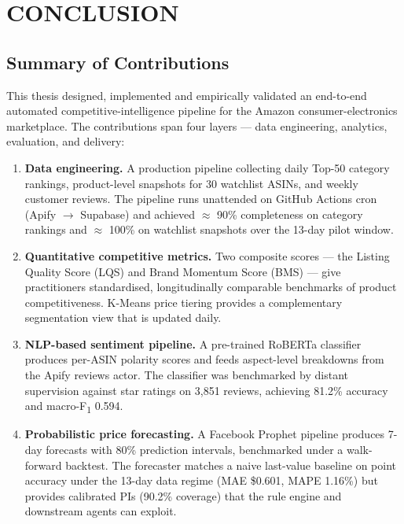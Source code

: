 \chapter{CONCLUSION}

\section{Summary of Contributions}

This thesis designed, implemented and empirically validated an end-to-end
automated competitive-intelligence pipeline for the Amazon
consumer-electronics marketplace. The contributions span four layers ---
data engineering, analytics, evaluation, and delivery:

\begin{enumerate}
  \item \textbf{Data engineering.} A production pipeline collecting daily
  Top-50 category rankings, product-level snapshots for 30 watchlist
  ASINs, and weekly customer reviews. The pipeline runs unattended on
  GitHub Actions cron (Apify $\to$ Supabase) and achieved
  $\approx$ 90\% completeness on category rankings and $\approx$ 100\%
  on watchlist snapshots over the 13-day pilot window.

  \item \textbf{Quantitative competitive metrics.} Two composite scores
  --- the Listing Quality Score (LQS) and Brand Momentum Score (BMS) ---
  give practitioners standardised, longitudinally comparable benchmarks of
  product competitiveness. K-Means price tiering provides a complementary
  segmentation view that is updated daily.

  \item \textbf{NLP-based sentiment pipeline.} A pre-trained RoBERTa
  classifier produces per-ASIN polarity scores and feeds aspect-level
  breakdowns from the Apify reviews actor. The classifier was benchmarked
  by distant supervision against star ratings on 3{,}851 reviews,
  achieving 81.2\% accuracy and macro-F\textsubscript{1} 0.594.

  \item \textbf{Probabilistic price forecasting.} A Facebook Prophet
  pipeline produces 7-day forecasts with 80\% prediction intervals,
  benchmarked under a walk-forward backtest. The forecaster matches a naive
  last-value baseline on point accuracy under the 13-day data regime
  (MAE \$0.601, MAPE 1.16\%) but provides calibrated PIs (90.2\% coverage)
  that the rule engine and downstream agents can exploit.


\end{enumerate}
